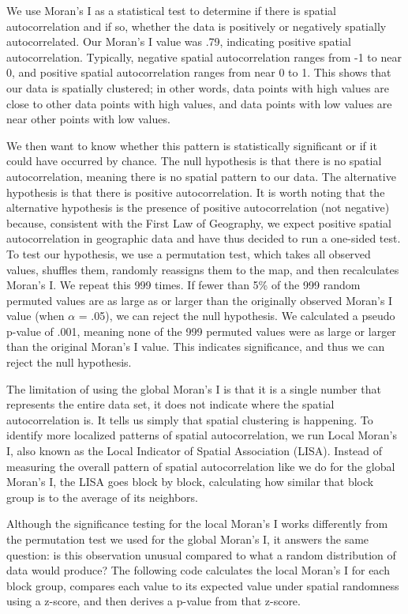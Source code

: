 \documentclass[
  12pt,
]{article}
\newcounter{none} %
\begin{document}
We use Moran's I as a statistical test to determine if there is spatial
autocorrelation and if so, whether the data is positively or negatively
spatially autocorrelated. Our Moran's I value was .79, indicating
positive spatial autocorrelation. Typically, negative spatial
autocorrelation ranges from -1 to near 0, and positive spatial
autocorrelation ranges from near 0 to 1. This shows that our data is
spatially clustered; in other words, data points with high values are
close to other data points with high values, and data points with low
values are near other points with low values.

We then want to know whether this pattern is statistically significant
or if it could have occurred by chance. The null hypothesis is that
there is no spatial autocorrelation, meaning there is no spatial pattern
to our data. The alternative hypothesis is that there is positive
autocorrelation. It is worth noting that the alternative hypothesis is
the presence of positive autocorrelation (not negative) because,
consistent with the First Law of Geography, we expect positive spatial
autocorrelation in geographic data and have thus decided to run a
one-sided test. To test our hypothesis, we use a permutation test, which
takes all observed values, shuffles them, randomly reassigns them to the
map, and then recalculates Moran's I. We repeat this 999 times. If fewer
than 5\% of the 999 random permuted values are as large as or larger
than the originally observed Moran's I value (when \(\alpha\) = .05), we
can reject the null hypothesis. We calculated a pseudo p-value of .001,
meaning none of the 999 permuted values were as large or larger than the
original Moran's I value. This indicates significance, and thus we can
reject the null hypothesis.

The limitation of using the global Moran's I is that it is a single
number that represents the entire data set, it does not indicate where
the spatial autocorrelation is. It tells us simply that spatial
clustering is happening. To identify more localized patterns of spatial
autocorrelation, we run Local Moran's I, also known as the Local
Indicator of Spatial Association (LISA). Instead of measuring the
overall pattern of spatial autocorrelation like we do for the global
Moran's I, the LISA goes block by block, calculating how similar that
block group is to the average of its neighbors.

Although the significance testing for the local Moran's I works
differently from the permutation test we used for the global Moran's I,
it answers the same question: is this observation unusual compared to
what a random distribution of data would produce? The following code
calculates the local Moran's I for each block group, compares each value
to its expected value under spatial randomness using a z-score, and then
derives a p-value from that z-score.
\end{document}

